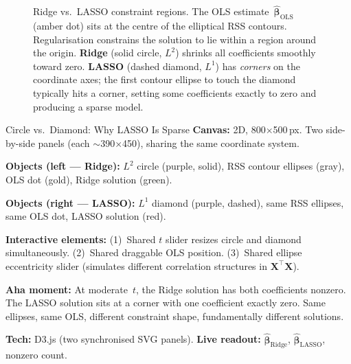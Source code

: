 \documentclass[11pt,a4paper]{article}
\theoremstyle{plain}
\theoremstyle{definition}
\newcommand{\bhat}{\hat{\bm{\beta}}}
\newcommand{\bX}{\bm{X}}
\begin{document}
\begin{figure}[ht]
\caption{Ridge vs.\ LASSO constraint regions.  The OLS
estimate~$\hat{\bm{\beta}}_{\mathrm{OLS}}$ (amber dot) sits at the
centre of the elliptical RSS contours.  Regularisation constrains the
solution to lie within a region around the origin.  \textbf{Ridge}
(solid circle, $L^2$) shrinks all coefficients smoothly toward zero.
\textbf{LASSO} (dashed diamond, $L^1$) has \emph{corners} on the
coordinate axes; the first contour ellipse to touch the diamond
typically hits a corner, setting some coefficients exactly to zero
and producing a sparse model.}
\label{fig:ridge-lasso}
\end{figure}

\begin{vizspec}{Circle vs.\ Diamond: Why LASSO Is Sparse}
\textbf{Canvas:} 2D, 800$\times$500\,px.  Two side-by-side panels
(each $\sim$390$\times$450), sharing the same coordinate system.

\textbf{Objects (left --- Ridge):} $L^2$ circle (\textcolor{constraint}{purple},
solid), RSS contour ellipses (\textcolor{secondary}{gray}), OLS dot
(\textcolor{response}{gold}), Ridge solution (\textcolor{projection}{green}).

\textbf{Objects (right --- LASSO):} $L^1$ diamond (\textcolor{constraint}{purple},
dashed), same RSS ellipses, same OLS dot, LASSO solution
(\textcolor{residual}{red}).

\textbf{Interactive elements:}
(1)~Shared $t$ slider resizes circle and diamond simultaneously.
(2)~Shared draggable OLS position.
(3)~Shared ellipse eccentricity slider (simulates different
correlation structures in $\bX^\top\bX$).

\textbf{Aha moment:} At moderate~$t$, the Ridge solution has both
coefficients nonzero.  The LASSO solution sits at a corner with one
coefficient exactly zero.  Same ellipses, same OLS, different constraint
shape, fundamentally different solutions.

\textbf{Tech:} D3.js (two synchronised SVG panels).
\quad \textbf{Live readout:} $\bhat_{\text{Ridge}}$,
$\bhat_{\text{LASSO}}$, nonzero count.
\end{vizspec}
\end{document}
